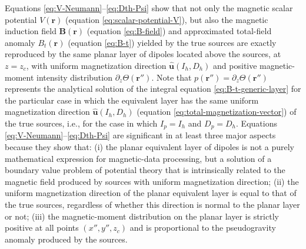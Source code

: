 Equations \ref{eq:V-Neumann}--\ref{eq:Dth-Psi} show that not only the magnetic scalar
potential $V(\mathbf{r})$ (equation \ref{eq:scalar-potential-V}), but also the magnetic
induction field $\mathbf{B}(\mathbf{r})$ (equation \ref{eq:B-field}) and 
approximated total-field anomaly $B_{t}(\mathbf{r})$ (equation \ref{eq:B-t}) 
yielded by the true sources are exactly reproduced by the same planar layer 
of dipoles located above the sources, at $z = z_{c}$, with uniform magnetization 
direction $\hat{\mathbf{u}}(I_{h}, D_{h})$ and positive magnetic-moment intensity
distribution $\partial_{z} \Theta(\mathbf{r}'')$. 
Note that $p(\mathbf{r}'') = \partial_{z} \Theta(\mathbf{r}'')$ represents
the analytical solution of the integral equation \ref{eq:B-t-generic-layer} for
the particular case in which the equivalent layer has the same uniform magnetization direction $\hat{\mathbf{u}}(I_{h}, D_{h})$ (equation \ref{eq:total-magnetization-vector}) 
of the true sources, i.e., for the case in which $I_{p} = I_{h}$ and $D_{p} = D_{h}$. 
Equations \ref{eq:V-Neumann}--\ref{eq:Dth-Psi} are significant in at least three 
major aspects because they show that:
(i) the planar equivalent layer of dipoles is not a purely 
mathematical expression for magnetic-data processing, but a solution of a
boundary value problem of potential theory that is intrinsically related to
the magnetic field produced by sources with uniform magnetization direction;
(ii) the uniform magnetization direction of the planar equivalent layer is 
equal to that of the true sources, regardless of whether 
this direction is normal to the planar layer or not;
(iii) the magnetic-moment distribution on the planar layer 
is strictly positive at all points $(x'',y'',z_{c})$ and is proportional to the
pseudogravity anomaly produced by the sources.

